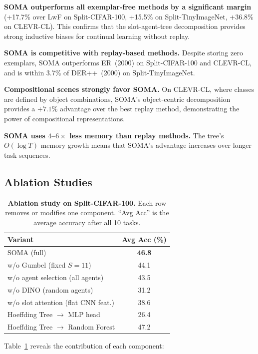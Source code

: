 \documentclass{article}
\begin{document}
\textbf{SOMA outperforms all exemplar-free methods by a significant margin}
(+17.7\% over LwF on Split-CIFAR-100, +15.5\% on Split-TinyImageNet, +36.8\% on CLEVR-CL).
This confirms that the slot-agent-tree decomposition provides strong inductive biases for continual learning without replay.

\textbf{SOMA is competitive with replay-based methods.}
Despite storing zero exemplars, SOMA outperforms ER~(2000) on Split-CIFAR-100 and CLEVR-CL, and is within 3.7\% of DER++~(2000) on Split-TinyImageNet.

\textbf{Compositional scenes strongly favor SOMA.}
On CLEVR-CL, where classes are defined by object combinations, SOMA's object-centric decomposition provides a $+7.1\%$ advantage over the best replay method, demonstrating the power of compositional representations.

\textbf{SOMA uses $4$--$6\times$ less memory than replay methods.}
The tree's $O(\log T)$ memory growth means that SOMA's advantage increases over longer task sequences.


\subsection{Ablation Studies}

\begin{table}[t]
\centering
\caption{\textbf{Ablation study on Split-CIFAR-100.} Each row removes or modifies one component. ``Avg Acc'' is the average accuracy after all 10 tasks.}
\label{tab:ablation}
\vspace{0.5em}
\begin{tabular}{lc}
\toprule
\textbf{Variant} & \textbf{Avg Acc (\%)} \\
\midrule
SOMA (full) & \textbf{46.8} \\
\midrule
\quad w/o Gumbel (fixed $S=11$) & 44.1 \\
\quad w/o agent selection (all agents) & 43.5 \\
\quad w/o DINO (random agents) & 31.2 \\
\quad w/o slot attention (flat CNN feat.) & 38.6 \\
\quad Hoeffding Tree $\to$ MLP head & 26.4 \\
\quad Hoeffding Tree $\to$ Random Forest & 47.2 \\
\bottomrule
\end{tabular}
\end{table}

Table~\ref{tab:ablation} reveals the contribution of each component:
\end{document}
